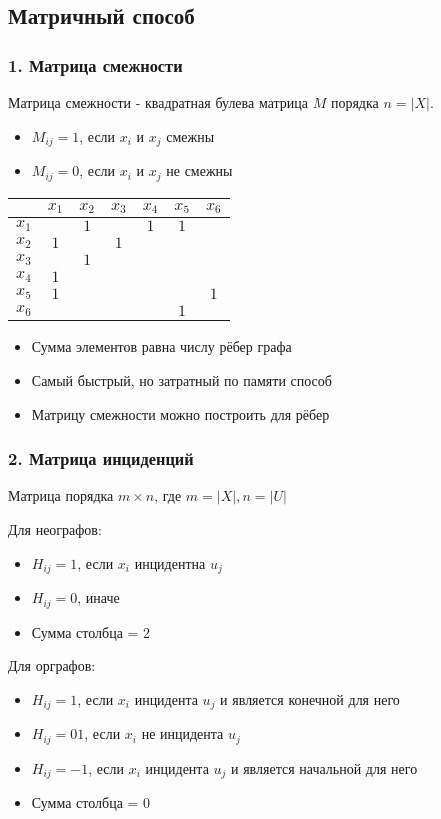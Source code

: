\documentclass[10pt]{article}
\begin{document}
\subsection*{Матричный способ}
\subsubsection*{1. Матрица смежности}
\par Матрица смежности - квадратная булева матрица $M$ порядка $n = |X|$.
\begin{itemize}
    \item $M_{ij} = 1$, если $x_{i}$ и $x_{j}$ смежны
    \item $M_{ij} = 0$, если $x_{i}$ и $x_{j}$ не смежны
\end{itemize}
\par \begin{tabular}{|c|c|c|c|c|c|c|}
    \hline
    & $x_{1}$ & $x_{2}$ & $x_{3}$ & $x_{4}$ & $x_{5}$ & $x_{6}$ \\
    \hline
    $x_{1}$ & & $1$ & & $1$ & $1$ & \\
    \hline
    $x_{2}$ & $1$ & & $1$ & & & \\
    \hline
    $x_{3}$ & & $1$ & & & & \\
    \hline
    $x_{4}$ & $1$ & & & & & \\
    \hline
    $x_{5}$ & $1$ & & & & & $1$ \\
    \hline
    $x_{6}$ & & & & & $1$ & \\
    \hline
\end{tabular}
\begin{itemize}
    \item Сумма элементов равна числу рёбер графа
    \item Самый быстрый, но затратный по памяти способ
    \item Матрицу смежности можно построить для рёбер
\end{itemize}
\subsubsection*{2. Матрица инциденций}
\par Матрица порядка $m \times n$, где $m = |X|, n = |U|$
\par Для неографов:
\begin{itemize}
    \item $H_{ij} = 1$, если $x_{i}$ инцидентна $u_{j}$
    \item $H_{ij} = 0$, иначе
    \item Сумма столбца = 2
\end{itemize}
Для орграфов:
\begin{itemize}
    \item $H_{ij} = 1$, если $x_{i}$ инцидента $u_{j}$ и является конечной для него
    \item $H_{ij} = 01$, если $x_{i}$ не инцидента $u_{j}$
    \item $H_{ij} = -1$, если $x_{i}$ инцидента $u_{j}$ и является начальной для него
    \item Сумма столбца = 0
\end{itemize}
\end{document}
